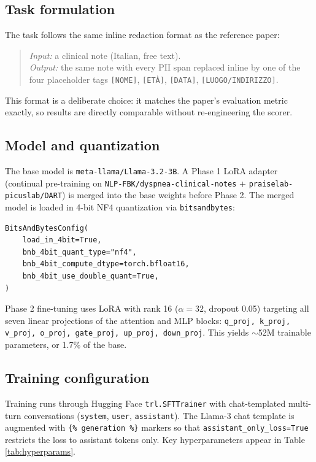\documentclass[11pt,a4paper]{article}
\begin{document}
\subsection{Task formulation}

The task follows the same inline redaction format as the reference paper:
\begin{quote}
\textit{Input:} a clinical note (Italian, free text).\\
\textit{Output:} the same note with every PII span replaced inline by one of the four placeholder tags \texttt{[NOME]}, \texttt{[ETÀ]}, \texttt{[DATA]}, \texttt{[LUOGO/INDIRIZZO]}.
\end{quote}
This format is a deliberate choice: it matches the paper's evaluation metric exactly, so results are directly comparable without re-engineering the scorer.

\subsection{Model and quantization}

The base model is \texttt{meta-llama/Llama-3.2-3B}. A Phase 1 LoRA adapter (continual pre-training on \texttt{NLP-FBK/dyspnea-clinical-notes} + \texttt{praiselab-picuslab/DART}) is merged into the base weights before Phase 2. The merged model is loaded in 4-bit NF4 quantization via \texttt{bitsandbytes}:

\begin{lstlisting}
BitsAndBytesConfig(
    load_in_4bit=True,
    bnb_4bit_quant_type="nf4",
    bnb_4bit_compute_dtype=torch.bfloat16,
    bnb_4bit_use_double_quant=True,
)
\end{lstlisting}

Phase 2 fine-tuning uses LoRA with rank 16 (\(\alpha = 32\), dropout 0.05) targeting all seven linear projections of the attention and MLP blocks: \texttt{q\_proj, k\_proj, v\_proj, o\_proj, gate\_proj, up\_proj, down\_proj}. This yields $\sim$52M trainable parameters, or 1.7\% of the base.

\subsection{Training configuration}

Training runs through Hugging Face \texttt{trl.SFTTrainer} with chat-templated multi-turn conversations (\texttt{system}, \texttt{user}, \texttt{assistant}). The Llama-3 chat template is augmented with \texttt{\{\% generation \%\}} markers so that \texttt{assistant\_only\_loss=True} restricts the loss to assistant tokens only. Key hyperparameters appear in Table \ref{tab:hyperparams}.
\end{document}
